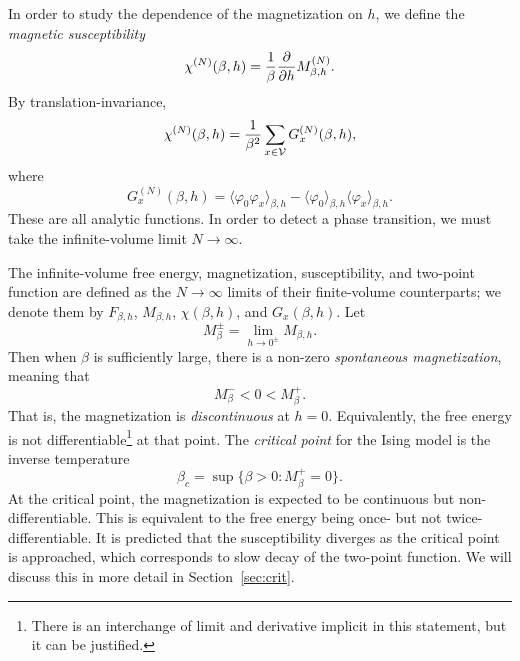 In order to study the dependence of the magnetization on $h$, we define the
\emph{magnetic susceptibility}
\begin{equation}
\chi^{(N)}(\beta, h)
	=
\frac{1}{\beta} \frac{\partial }{\partial h} M^{(N)}_{\beta,h}.
\end{equation}
By translation-invariance,
\begin{equation}
\label{e:Ising-suscept}
\chi^{(N)}(\beta, h)
	=
\frac{1}{\beta^2}
\sum_{x\in\mathcal{V}} G^{(N)}_x(\beta, h),
\end{equation}
where
\begin{equation}
\label{e:Ising-2pt}
G^{(N)}_x(\beta, h)
	=
\langle \varphi_0 \varphi_x \rangle_{\beta,h}
	-
\langle\varphi_0\rangle_{\beta,h} \langle\varphi_x\rangle_{\beta,h}.
\end{equation}
These are all analytic functions.
In order to detect a phase transition, we must take the infinite-volume limit $N\to\infty$.

The infinite-volume free energy, magnetization, susceptibility, and two-point function
are defined as the $N\to\infty$ limits of their finite-volume counterparts; we denote them by
$F_{\beta,h}$, $M_{\beta,h}$, $\chi(\beta, h)$, and $G_x(\beta, h)$.
Let
\begin{equation}
M^\pm_{\beta} = \lim_{h\to0^\pm} M_{\beta,h}.
\end{equation}
Then when $\beta$ is sufficiently large, there is a non-zero \emph{spontaneous magnetization},
meaning that
\begin{equation}
M^-_\beta < 0 < M^+_\beta.
\end{equation}
That is, the magnetization is \emph{discontinuous} at $h = 0$. Equivalently, the free energy
is not differentiable\footnote{There is an interchange of limit and derivative implicit in
this statement, but it can be justified.} at that point. The \emph{critical point} for the
Ising model is the inverse temperature
\begin{equation}
\beta_c = \sup\{\beta > 0 : M^+_\beta = 0 \}.
\end{equation}
At the critical point, the magnetization is expected to be continuous but non-differentiable.
This is equivalent to the free energy being once- but not twice-differentiable.
It is predicted that the
susceptibility diverges as the critical point is approached, which corresponds to slow decay
of the two-point function. We will discuss this in more detail in Section~\ref{sec:crit}.


